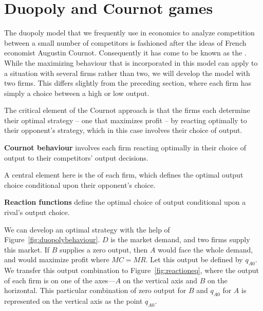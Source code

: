 \section{Duopoly and Cournot games}\label{sec:ch11sec5}

The duopoly model that we frequently use in economics to analyze competition
between a small number of competitors is fashioned after the ideas of French
economist Augustin Cournot. Consequently it has come to be known as the %
. While the maximizing behaviour that is
incorporated in this model can apply to a situation with several firms
rather than two, we will develop the model with two firms. This differs
slightly from the preceding section, where each firm has simply a choice
between a high or low output.

The critical element of the Cournot approach is that the firms each
determine their optimal strategy -- one that maximizes profit -- by reacting
optimally to their opponent's strategy, which in this case involves their
choice of output.

\begin{DefBox}
	\textbf{Cournot behaviour} involves each firm reacting optimally in their choice of output to their competitors' output decisions.
\end{DefBox}

A central element here is the  of each firm,
which defines the optimal output choice conditional upon their opponent's
choice.

\begin{DefBox}
	\textbf{Reaction functions} define the optimal choice of output conditional upon a rival's output choice.
\end{DefBox}

\newhtmlpage

We can develop an optimal strategy with the help of Figure~\ref{fig:duopolybehaviour}.
$D$ is the market demand, and two firms supply this
market. If $B$ supplies a zero output, then $A$ would face the whole demand,
and would maximize profit where $MC=MR$. Let this output be defined by 
$q_{A0}$. We transfer this output combination to Figure~\ref{fig:reactioneq},
where the output of each firm is on one of the axes---$A$ on the vertical
axis and $B$ on the horizontal. This particular combination of zero output
for $B$ and $q_{A0}$ for $A$ is represented on the vertical axis as the
point $q_{A0}$.



